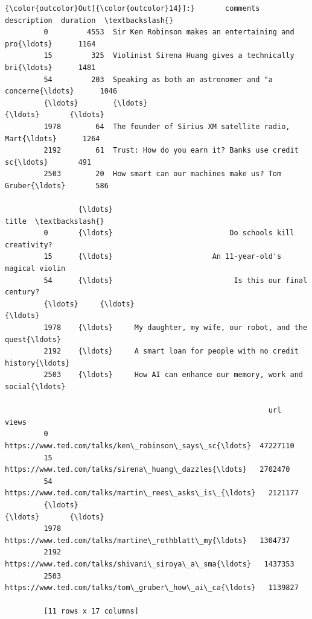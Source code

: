 \documentclass[11pt]{ctexart}
\begin{document}
\begin{Verbatim}[commandchars=\\\{\}]
{\color{outcolor}Out[{\color{outcolor}14}]:}       comments                                        description  duration  \textbackslash{}
         0         4553  Sir Ken Robinson makes an entertaining and pro{\ldots}      1164   
         15         325  Violinist Sirena Huang gives a technically bri{\ldots}      1481   
         54         203  Speaking as both an astronomer and "a concerne{\ldots}      1046   
         {\ldots}        {\ldots}                                                {\ldots}       {\ldots}   
         1978        64  The founder of Sirius XM satellite radio, Mart{\ldots}      1264   
         2192        61  Trust: How do you earn it? Banks use credit sc{\ldots}       491   
         2503        20  How smart can our machines make us? Tom Gruber{\ldots}       586   
         
                 {\ldots}                                                 title  \textbackslash{}
         0       {\ldots}                           Do schools kill creativity?   
         15      {\ldots}                       An 11-year-old's magical violin   
         54      {\ldots}                            Is this our final century?   
         {\ldots}     {\ldots}                                                   {\ldots}   
         1978    {\ldots}     My daughter, my wife, our robot, and the quest{\ldots}   
         2192    {\ldots}     A smart loan for people with no credit history{\ldots}   
         2503    {\ldots}     How AI can enhance our memory, work and social{\ldots}   
         
                                                             url     views  
         0     https://www.ted.com/talks/ken\_robinson\_says\_sc{\ldots}  47227110  
         15    https://www.ted.com/talks/sirena\_huang\_dazzles{\ldots}   2702470  
         54    https://www.ted.com/talks/martin\_rees\_asks\_is\_{\ldots}   2121177  
         {\ldots}                                                 {\ldots}       {\ldots}  
         1978  https://www.ted.com/talks/martine\_rothblatt\_my{\ldots}   1304737  
         2192  https://www.ted.com/talks/shivani\_siroya\_a\_sma{\ldots}   1437353  
         2503  https://www.ted.com/talks/tom\_gruber\_how\_ai\_ca{\ldots}   1139827  
         
         [11 rows x 17 columns]
\end{Verbatim}
            
\end{document}

